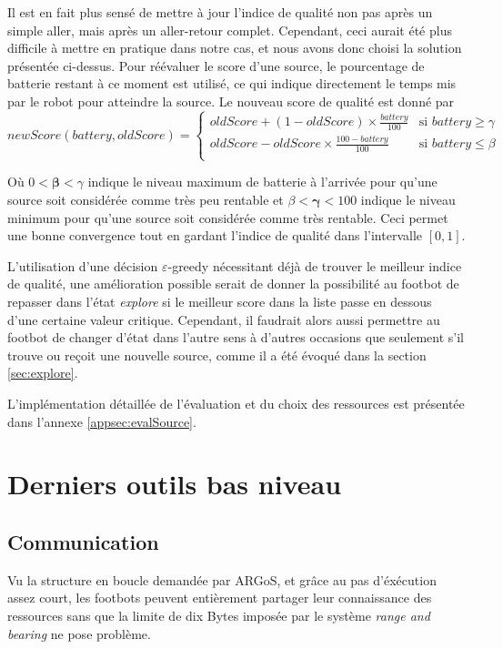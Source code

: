 Il est en fait plus sensé de mettre à jour l'indice de qualité non pas après un simple aller, mais après un aller-retour complet. Cependant, ceci aurait été plus difficile à mettre en pratique dans notre cas, et nous avons donc choisi la solution présentée ci-dessus. Pour réévaluer le score d'une source, le pourcentage de batterie restant à ce moment est utilisé, ce qui indique directement le temps mis par le robot pour atteindre la source. Le nouveau score de qualité est donné par
\[newScore(battery, oldScore)=
  \begin{cases}
      oldScore+(1-oldScore) \times \frac{battery}{100} & \text{si }battery \geq \gamma\\
      oldScore-oldScore \times \frac{100-battery}{100} & \text{si } battery \leq \beta\\
  \end{cases}
\]

Où $0<\boldsymbol{\beta}<\gamma$ indique le niveau maximum de batterie à l'arrivée pour qu'une source soit considérée comme très peu rentable et $\beta<\boldsymbol{\gamma}<100$ indique le niveau minimum pour qu'une source soit considérée comme très rentable. Ceci permet une bonne convergence tout en gardant l'indice de qualité dans l'intervalle $[0,1]$.

L'utilisation d'une décision $\varepsilon$-greedy nécessitant déjà de trouver le meilleur indice de qualité, une amélioration possible serait de donner la possibilité au footbot de repasser dans l'état \emph{explore} si le meilleur score dans la liste passe en dessous d'une certaine valeur critique. Cependant, il faudrait alors aussi permettre au footbot de changer d'état dans l'autre sens à d'autres occasions que seulement s'il trouve ou reçoit une nouvelle source, comme il a été évoqué dans la section \ref{sec:explore}.

L'implémentation détaillée de l'évaluation et du choix des ressources est présentée dans l'annexe \ref{appsec:evalSource}.

\section{Derniers outils bas niveau}

\subsection{Communication\label{sec:commu}}

Vu la structure en boucle demandée par ARGoS, et grâce au pas d'éxécution assez court, les footbots peuvent entièrement partager leur connaissance des ressources sans que la limite de dix Bytes imposée par le système \emph{range and bearing} ne pose problème.

